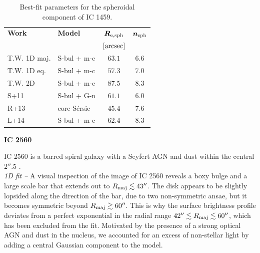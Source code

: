 \documentclass[preprint2]{emulateapj}
\begin{document}
  \begin{table}[h]
  \small
  \caption{Best-fit parameters for the spheroidal component of IC 1459.}
  \begin{center}
  \begin{tabular}{llcc}
  \hline
  {\bf Work} & {\bf Model}   & $\bm R_{\rm e,sph}$    & $\bm n_{\rm sph}$ \\
    &  &  $[\rm arcsec]$ & \\
  \hline
  T.W. 1D maj. & S-bul + m-c & $63.1$  &  $6.6$ \\
  T.W. 1D eq.  & S-bul + m-c & $57.3$  &  $7.0$ \\
  T.W. 2D      & S-bul + m-c & $87.5$  &  $8.3$ \\
  \hline
  S+11         & S-bul + G-n   & $61.1$  &  $6.0$ \\
  R+13         & core-S\'ersic & $45.4$  &  $7.6$ \\
  L+14         & S-bul + m-c   & $62.4$  &  $8.3$ \\
  \hline
  \end{tabular}
  \end{center}
  \label{tab:ic1459}
  \end{table}

  \clearpage\newpage\noindent
  {\bf IC 2560 \\}

  IC 2560 is a barred spiral galaxy with a Seyfert AGN \citep{veroncettyveron2006}
  and dust within the central $2''.5$ \citep{martini2003}.\\

  \emph{1D fit -- }
  A visual inspection of the image of IC 2560 reveals a boxy bulge and
  a large scale bar that extends out to $R_{\rm maj} \lesssim 43''$.
  The disk appears to be slightly lopsided along the direction of the bar,
  due to two non-symmetric ansae, but it becomes symmetric beyond $R_{\rm maj} \gtrsim 60''$. 
  This is why the surface brightness profile deviates from a perfect exponential
  in the radial range $42'' \lesssim R_{\rm maj} \lesssim 60''$, which has been excluded from the fit.
  Motivated by the presence of a strong optical AGN and dust in the nucleus, 
  we accounted for an excess of non-stellar light by adding a central Gaussian component to the model.\\
  
\end{document}
